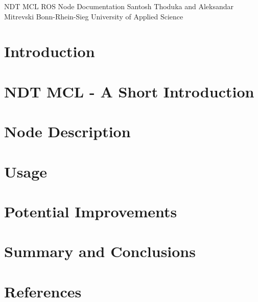 \documentclass[12pt]{article}
\begin{document}
	\begin{titlepage}
		\vspace*{\fill}
		\begin{center}
			\begin{spacing}{1.5}
				NDT MCL ROS Node Documentation
				\linebreak
				Santosh Thoduka and Aleksandar Mitrevski
				\linebreak
				Bonn-Rhein-Sieg University of Applied Science
			\end{spacing}
		\end{center}
		\vspace*{\fill}
	\end{titlepage}

\setcounter{page}{2}

\newpage
	\setlength{\parindent}{0.5in}

	\tableofcontents

\newpage

	\section{Introduction}
	\label{sec:introduction}

	\section{NDT MCL - A Short Introduction}
	\label{sec:ndtMclIntroduction}

	\section{Node Description}
	\label{sec:nodeDescription}

	\section{Usage}
	\label{sec:usage}

	\section{Potential Improvements}
	\label{sec:potentialImprovements}

	\section{Summary and Conclusions}
	\label{sec:summaryAndConclusions}

	\section{References}
	\label{sec:references}
\end{document}

